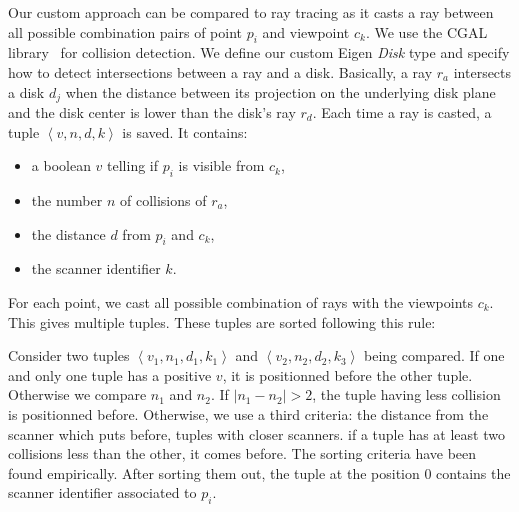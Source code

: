 Our custom approach can be compared to ray tracing as it casts a ray between all possible combination pairs of point $p_i$ and viewpoint $c_k$. We use the CGAL library~\cite{cgal} for collision detection. We define our custom Eigen \emph{Disk} type and specify how to detect intersections between a ray and a disk. Basically, a ray $r_a$ intersects a disk $d_j$ when the distance between its projection on the underlying disk plane and the disk center is lower than the
disk's ray $r_d$. Each time a ray is casted, a tuple $\left\langle v, n, d, k \right\rangle$ is saved. It contains:
\begin{itemize}
  \item a boolean $v$ telling if $p_i$ is visible from $c_k$,
  \item the number $n$ of collisions of $r_a$,
  \item the distance $d$ from $p_i$ and $c_k$,
  \item the scanner identifier $k$.
\end{itemize}

For each point, we cast all possible combination of rays with the viewpoints $c_k$. This gives multiple tuples. These tuples are sorted following this rule:

Consider two tuples $\left\langle v_1, n_1, d_1, k_1 \right\rangle$ and $\left \langle v_2, n_2, d_2, k_3 \right\rangle$ being compared. If one and only one tuple has a positive $v$, it is positionned before the other tuple. Otherwise we compare $n_1$ and $n_2$. If $ | n_1 - n_2 | > 2 $, the tuple having less collision is positionned before. Otherwise, we use a third criteria: the distance from the scanner which puts before, tuples with closer scanners. if a tuple has at least two collisions less than the other, it comes before. The sorting criteria have been found empirically. After sorting them out, the tuple at the position $0$ contains the scanner identifier associated to $p_i$.

